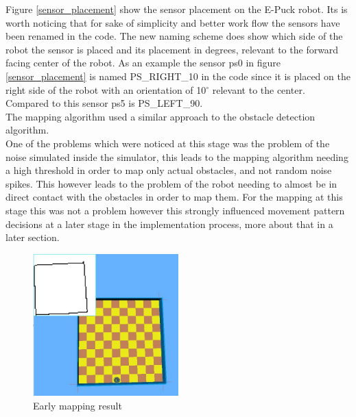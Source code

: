 \begin{flushleft}
Figure  \ref{sensor_placement} show the sensor placement on the E-Puck robot. Its is worth noticing that for sake of simplicity and better work flow the sensors have been renamed in the code. The new naming scheme does show which side of the robot the sensor is placed and its placement in degrees, relevant to the forward facing center of the robot. As an example the sensor ps0 in figure \ref{sensor_placement} is named PS\_RIGHT\_10 in the code since it is placed on the right side of the robot with an orientation of 10$^{\circ}$ relevant to the center.
Compared to this sensor ps5 is PS\_LEFT\_90.   \\[3ex]

The mapping algorithm used a similar approach to the obstacle detection algorithm. \\
One of the problems which were noticed at this stage was the problem of the noise simulated inside the simulator, this leads to the mapping algorithm needing a high threshold in order to map only actual obstacles, and not random noise spikes.  This however leads to the problem of the robot needing to almost be in direct contact with the obstacles in order to map them. For the mapping at this stage this was not a problem however this strongly influenced movement pattern decisions at a later stage in the implementation process, more about that in a later section.

\begin{figure}[h]
\centering
\includegraphics[width = 0.5\textwidth]{../../figures/early_map.jpg} 
\caption{Early mapping result}
\label{early_mapping_result}
\end{figure}


\end{flushleft}
